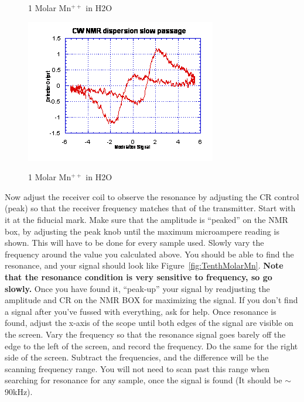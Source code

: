 \documentclass{../lab}
\begin{document}
\begin{enumerate}
\begin{figure}[h]
\begin{minipage}[t]{0.32\textwidth}
        \caption{1 Molar Mn$^{++}$ in H2O}
    \end{minipage}\hfill
    \begin{minipage}[t]{0.32\textwidth}
        \href{http://experimentationlab.berkeley.edu/sites/default/files/images/NMR23.gif}{\includegraphics[width=\linewidth,keepaspectratio]{images/NMR23.png}}
        \caption{1 Molar Mn$^{++}$ in H2O}
        \label{fig:onemolar}
    \end{minipage}
    \end{figure}

\newpage

    Now adjust the receiver coil to observe the resonance by adjusting the CR control (peak) so that the receiver frequency matches that of the transmitter. Start with it at the fiducial mark. Make sure that the amplitude is ``peaked'' on the NMR box, by adjusting the peak knob until the maximum microampere reading is shown. This will have to be done for every sample used. Slowly vary the frequency around the value you calculated above. You should be able to find the resonance, and your signal should look like Figure~\ref{fig:TenthMolarMn}. \textbf{Note that the resonance condition is very sensitive to frequency, so go slowly.} Once you have found it, ``peak-up'' your signal by readjusting the amplitude and CR on the NMR BOX for maximizing the signal. If you don't find a signal after you've fussed with everything, ask for help. Once resonance is found, adjust the x-axis of the scope until both edges of the signal are visible on the screen. Vary the frequency so that the resonance signal goes barely off the edge to the left of the screen, and record the frequency. Do the same for the right side of the screen. Subtract the frequencies, and the difference will be the scanning frequency range. You will not need to scan past this range when searching for resonance for any sample, once the signal is found (It should be $\sim$90kHz).
    

\end{enumerate}
\end{document}
